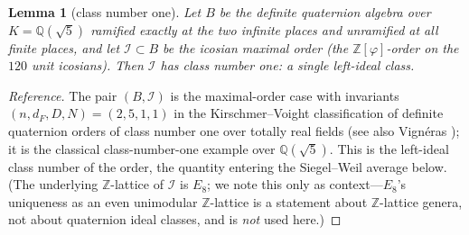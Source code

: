 \documentclass[11pt]{article}
\newtheorem{lemma}[theorem]{Lemma}
\theoremstyle{definition}
\newcommand{\Z}{\mathbb{Z}}
\newcommand{\Q}{\mathbb{Q}}
\newcommand{\Icos}{\mathcal{I}}
\begin{document}
\begin{lemma}[class number one]\label{lem:h1}
Let $B$ be the definite quaternion algebra over $K=\Q(\sqrt5)$ ramified exactly at the
two infinite places and unramified at all finite places, and let $\Icos\subset B$ be
the icosian maximal order (the $\Z[\varphi]$-order on the $120$ unit icosians). Then
$\Icos$ has \emph{class number one}: a single left-ideal class.
\end{lemma}
\begin{proof}[Reference]
The pair $(B,\Icos)$ is the maximal-order case with invariants
$(n,d_F,D,N)=(2,5,1,1)$ in the Kirschmer--Voight classification of definite quaternion
orders of class number one over totally real fields
\cite[Table 8.2]{KirschmerVoight} (see also Vign\'eras \cite{Vigneras}); it is the
classical class-number-one example over $\Q(\sqrt5)$. This is the left-ideal class
number of the order, the quantity entering the Siegel--Weil average below. (The
underlying $\Z$-lattice of $\Icos$ is $E_8$; we note this only as context---$E_8$'s
uniqueness as an even unimodular $\Z$-lattice is a statement about $\Z$-lattice genera,
not about quaternion ideal classes, and is \emph{not} used here.)
\end{proof}
\end{document}
